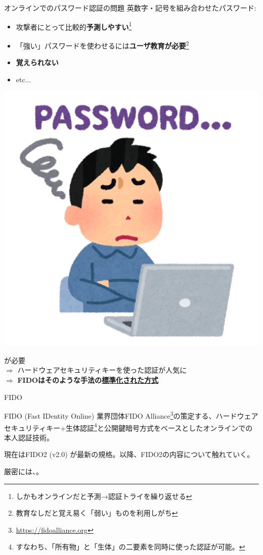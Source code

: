 \documentclass[12pt,dvipdfmx,uplatex]{beamer}
\begin{document}
\begin{frame}{オンラインでのパスワード認証の問題}
英数字・記号を組み合わせたパスワード:
\begin{itemize}
 \item 攻撃者にとって比較的\textbf{予測しやすい}\footnote[frame]{\scriptsize しかもオンラインだと予測→認証トライを繰り返せる}
 \item 「強い」パスワードを使わせるには\textbf{ユーザ教育が必要}\footnote[frame]{\scriptsize 教育なしだと覚え易く「弱い」ものを利用しがち}
 \item \textbf{覚えられない}
 \item etc...
\end{itemize}

\vspace{-5ex}
\begin{center}
\includegraphics[width=0.2\linewidth]{Figs/password-forget.pdf}
\end{center}
\vspace{-2ex}

が必要\\
$\Rightarrow$ \alert{ハードウェアセキュリティキーを使った認証}が人気に\\
$\Rightarrow$ \textbf{FIDOはそのような手法の\ul{標準化された方式}}

\end{frame}

\begin{frame}{FIDO}

\begin{block}{\small FIDO (Fast IDentity Online)}
業界団体FIDO Alliance\footnote[frame]{\scriptsize \url{https://fidoalliance.org}}の策定する、\alert{ハードウェアセキュリティキー+生体認証\footnote[frame]{\scriptsize すなわち、「所有物」と「生体」の二要素を同時に使った認証が可能。}と公開鍵暗号方式をベースとしたオンラインでの本人認証技術}。
\end{block}

現在はFIDO2 (v2.0) が最新の規格。以降、FIDO2の内容について触れていく。

\vspace{2ex}

厳密には、。

\end{frame}
\end{document}

